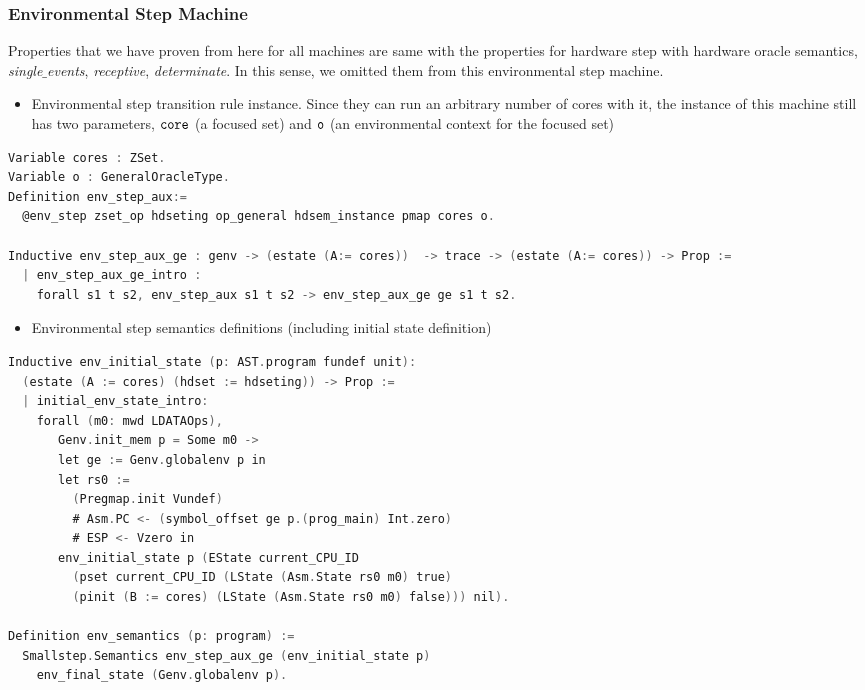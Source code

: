 \subsubsection{Environmental Step Machine}

Properties that we have proven from here for all machines are same with the properties for  hardware step with hardware oracle semantics,
\textit{single$\_$events}, \textit{receptive}, \textit{determinate}. 
In this sense, we omitted them from this environmental step machine.

\begin{itemize}[leftmargin=*]
\item Environmental step transition rule instance. Since they can run an arbitrary number of cores with it, 
the instance of this machine still has two parameters, ${\mathrm{\texttt{core}}}$ (a focused set) and ${\mathrm{\texttt{o}}}$ (an environmental context for 
the focused set)
\end{itemize}
\begin{lstlisting}[language=C]
Variable cores : ZSet.
Variable o : GeneralOracleType.
Definition env_step_aux:=
  @env_step zset_op hdseting op_general hdsem_instance pmap cores o.

Inductive env_step_aux_ge : genv -> (estate (A:= cores))  -> trace -> (estate (A:= cores)) -> Prop :=
  | env_step_aux_ge_intro : 
    forall s1 t s2, env_step_aux s1 t s2 -> env_step_aux_ge ge s1 t s2.
\end{lstlisting}

\begin{itemize}[leftmargin=*]
\item Environmental step  semantics definitions (including initial state definition)
\end{itemize}
\begin{lstlisting}[language=C]
Inductive env_initial_state (p: AST.program fundef unit): 
  (estate (A := cores) (hdset := hdseting)) -> Prop :=
  | initial_env_state_intro: 
    forall (m0: mwd LDATAOps),
       Genv.init_mem p = Some m0 ->
       let ge := Genv.globalenv p in
       let rs0 :=
         (Pregmap.init Vundef)
         # Asm.PC <- (symbol_offset ge p.(prog_main) Int.zero)
         # ESP <- Vzero in
       env_initial_state p (EState current_CPU_ID 
         (pset current_CPU_ID (LState (Asm.State rs0 m0) true)
         (pinit (B := cores) (LState (Asm.State rs0 m0) false))) nil).

Definition env_semantics (p: program) :=
  Smallstep.Semantics env_step_aux_ge (env_initial_state p) 
    env_final_state (Genv.globalenv p).    
\end{lstlisting}

